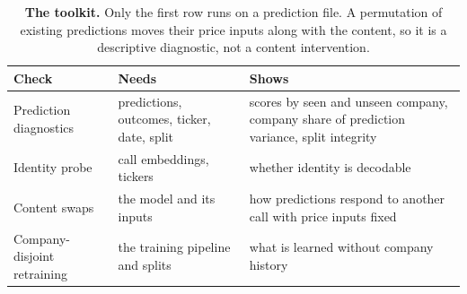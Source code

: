 \begin{table}[t]
\centering
\footnotesize
\setlength{\tabcolsep}{3pt}
\begin{tabular}{p{2.0cm}p{2.2cm}p{2.8cm}}
\toprule
Check & Needs & Shows \\
\midrule
Prediction diagnostics & predictions, outcomes, ticker, date, split & scores by seen and unseen company, company share of prediction variance, split integrity \\
Identity probe & call embeddings, tickers & whether identity is decodable \\
Content swaps & the model and its inputs & how predictions respond to another call with price inputs fixed \\
Company-disjoint retraining & the training pipeline and splits & what is learned without company history \\
\bottomrule
\end{tabular}
\caption{\textbf{The toolkit.} Only the first row runs on a prediction file. A
permutation of existing predictions moves their price inputs along with the
content, so it is a descriptive diagnostic, not a content intervention.}
\label{tab:toolkit}
\end{table}
